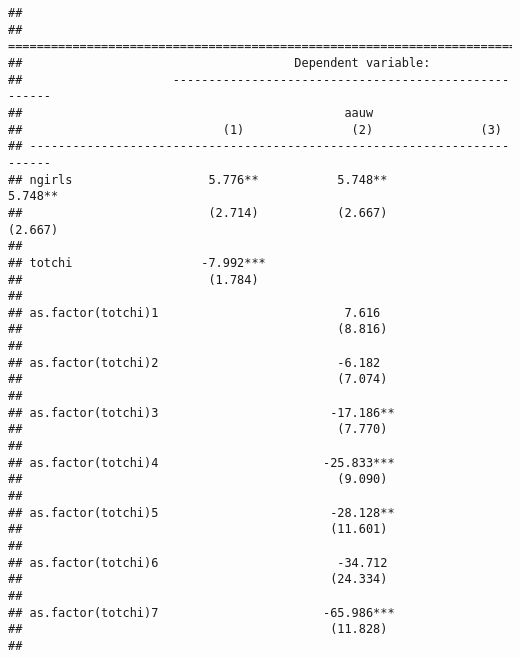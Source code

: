 \documentclass[
]{article}
\begin{document}
\begin{verbatim}
## 
## =========================================================================
##                                      Dependent variable:                 
##                     -----------------------------------------------------
##                                             aauw                         
##                            (1)               (2)               (3)       
## -------------------------------------------------------------------------
## ngirls                   5.776**           5.748**           5.748**     
##                          (2.714)           (2.667)           (2.667)     
##                                                                          
## totchi                  -7.992***                                        
##                          (1.784)                                         
##                                                                          
## as.factor(totchi)1                          7.616                        
##                                            (8.816)                       
##                                                                          
## as.factor(totchi)2                         -6.182                        
##                                            (7.074)                       
##                                                                          
## as.factor(totchi)3                        -17.186**                      
##                                            (7.770)                       
##                                                                          
## as.factor(totchi)4                       -25.833***                      
##                                            (9.090)                       
##                                                                          
## as.factor(totchi)5                        -28.128**                      
##                                           (11.601)                       
##                                                                          
## as.factor(totchi)6                         -34.712                       
##                                           (24.334)                       
##                                                                          
## as.factor(totchi)7                       -65.986***                      
##                                           (11.828)                       
##                                                                          

\end{verbatim}
\end{document}
